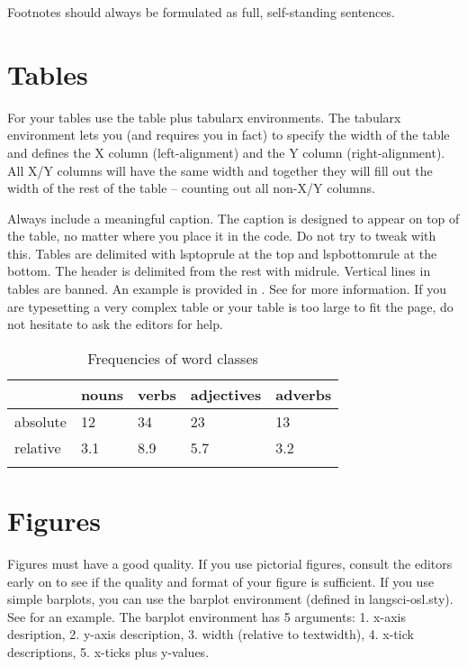 Footnotes should always be formulated as full, self-standing sentences.

\section{Tables}

For your tables use the table plus tabularx environments. The tabularx environment lets you (and requires you in fact) to specify the width of the table and defines the X column (left-alignment) and the Y column (right-alignment). All X/Y columns will have the same width and together they will fill out the width of the rest of the table -- counting out all non-X/Y columns.

Always include a meaningful caption. The caption is designed to appear on top of the table, no matter where you place it in the code. Do not try to tweak with this. Tables are delimited with lsptoprule at the top and lspbottomrule at the bottom. The header is delimited from the rest with midrule. Vertical lines in tables are banned. An example is provided in . See \citet{Nordhoff.Muller2021} for more information. If you are typesetting a very complex table or your table is too large to fit the page, do not hesitate to ask the editors for help.

\begin{table}
\caption{Frequencies of word classes}
\label{sim:tab:frequencies}
 \begin{tabularx}{.77\textwidth}{lYYYY} %
  \lsptoprule
            & nouns & verbs  & adjectives & adverbs\\
  \midrule
  absolute  &   12  &    34  &    23      & 13\\
  relative  &   3.1 &   8.9  &    5.7     & 3.2\\
  \lspbottomrule
 \end{tabularx}
\end{table}

\section{Figures}

Figures must have a good quality. If you use pictorial figures, consult the editors early on to see if the quality and format of your figure is sufficient. If you use simple barplots, you can use the barplot environment (defined in langsci-osl.sty). See  for an example. The barplot environment has 5 arguments: 1. x-axis desription, 2. y-axis description, 3. width (relative to textwidth), 4. x-tick descriptions, 5. x-ticks plus y-values.


